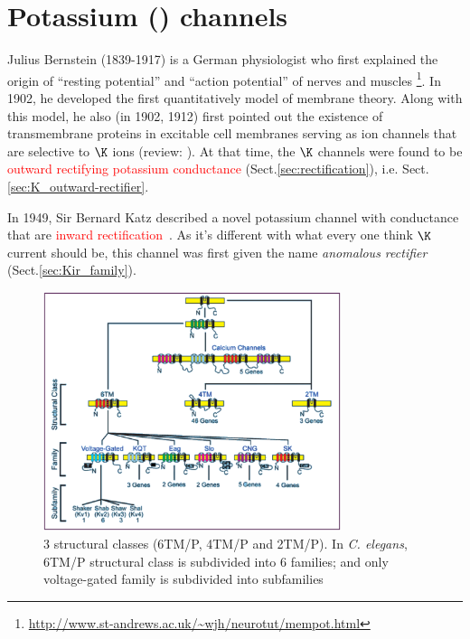 \chapter{\texorpdfstring{Potassium () channels}{Potassium channels (K+
channels)}}
\label{chap:potassium-channels}

\def\SK{{\text{SK}}}
\def\KACh{{\text{{KACh}}}}
\def\TEA{{\text{TEA}}}
\def\Erev{{\text{E}_{\text{rev}}}}
\def\KtwoP{{\text{K}_{\text{2P}}}}

Julius Bernstein (1839-1917) is a German physiologist who first explained the
origin of ``resting potential'' and ``action potential'' of nerves and muscles
\footnote{\url{http://www.st-andrews.ac.uk/~wjh/neurotut/mempot.html}}.
In 1902, he developed the first quantitatively model of membrane theory. Along
with this model, he also (in 1902, 1912) first pointed out the existence of
transmembrane proteins in excitable cell membranes serving as ion channels that
are selective to $\K$ ions (review: \citep{seyfarth2006}). At that time, the $\K$
channels were found to be \textcolor{red}{outward rectifying potassium
conductance} (Sect.\ref{sec:rectification}), i.e.
Sect.\ref{sec:K_outward-rectifier}.
  
In 1949, Sir Bernard Katz described a novel potassium channel with conductance
that are \textcolor{red}{inward rectification}~\citep{Katz1949}. As it's different with
what every one think $\K$ current should be, this channel was first given the
name {\it anomalous rectifier} (Sect.\ref{sec:Kir_family}).

\begin{figure}[hbt]
  \centerline{\includegraphics[height=7cm,
    angle=0]{./images/K-channel_classification.eps}}
\caption{3 structural classes (6TM/P, 4TM/P and 2TM/P). In {\it C. elegans},
6TM/P structural class is subdivided into 6 families; and only
voltage-gated family is subdivided into subfamilies \citep{wei1996}}
\label{fig:K-channel_classification}
\end{figure}

